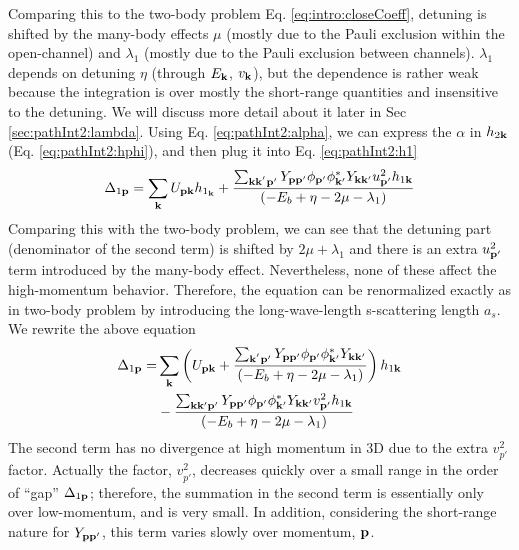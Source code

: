 Comparing this to the two-body problem Eq. \ref{eq:intro:closeCoeff}, detuning is shifted by the many-body effects $\mu$ (mostly due to the Pauli exclusion within the open-channel) and $\lambda_{1}$ (mostly due to the Pauli exclusion between channels). 
$\lambda_{1}$ depends on detuning $\eta$ (through $E_{\mathbf{k}}$, $v_{\mathbf{k}}$), but the dependence is rather weak because the integration is over mostly the short-range quantities and  insensitive to the detuning. We will discuss more detail about it later in Sec \ref{sec:pathInt2:lambda}. 
Using Eq. \ref{eq:pathInt2:alpha}, we can express the $\alpha$ in $h_{2\mathbf{k}}$ (Eq. \ref{eq:pathInt2:hphi}), and then plug it into Eq. \ref{eq:pathInt2:h1}
\begin{equation*}
\Delta_{1\mathbf{p}}=\sum_{\mathbf{k}}{}U_{\mathbf{p}\mathbf{k}}{h_{1_{\mathbf{k}}}}+
	\frac{\sum_{\mathbf{k}\mathbf{k}^{'}\mathbf{p}'} Y_{\mathbf{p}\mathbf{p}'}{\phi_{\mathbf{p}'}}{\phi_{\mathbf{k}'}^{*}}{Y_{\mathbf{k}\mathbf{k}'}}u_{\mathbf{p}'}^{2}{{h_{1\mathbf{k}}}}}
		{\left(-E_{b}+\eta-2\mu-\lambda_{1}\right)}
\end{equation*}
Comparing this with the two-body problem, we can see that the detuning part (denominator of the second term) is shifted by $2\mu+\lambda_{1}$ and there is an extra $u_{\mathbf{p}'}^{2}$ term introduced by the many-body effect.  Nevertheless, none of these affect the high-momentum behavior. Therefore, the equation can be renormalized exactly as in two-body problem by introducing the long-wave-length s-scattering length $a_{s}$.  We rewrite the above equation
\begin{equation*}
\begin{split}
\Delta_{1\mathbf{p}}=&\sum_{\mathbf{k}}\left(U_{\mathbf{p}\mathbf{k}}+
	\frac{\sum_{\mathbf{k}^{'}\mathbf{p}'} Y_{\mathbf{p}\mathbf{p}'}{\phi_{\mathbf{p}'}}{\phi_{\mathbf{k}'}^{*}}{Y_{\mathbf{k}\mathbf{k}'}}}
		{\left(-E_{b}+\eta-2\mu-\lambda_{1}\right)}\right){{h_{1\mathbf{k}}}}\\
	&-\frac{\sum_{\mathbf{k}\mathbf{k}{'}\mathbf{p}'} Y_{\mathbf{p}\mathbf{p}'}{\phi_{\mathbf{p}'}}{\phi_{\mathbf{k}'}^{*}}{Y_{\mathbf{k}\mathbf{k}'}}v_{\mathbf{p}'}^{2}{h_{1\mathbf{k}}}}
		{\left(-E_{b}+\eta-2\mu-\lambda_{1}\right)}{}
\end{split}
\end{equation*}
The second term has no divergence at high momentum in 3D due to the extra $v_{p'}^{2}$ factor. Actually the factor, $v_{p'}^{2}$, decreases quickly over a small range in the order of  ``gap'' $\Delta_{1\mathbf{p}}$; therefore, the summation in the second term is essentially only over low-momentum, and is very small.   In addition, considering the short-range nature for $Y_{\mathbf{p}\mathbf{p}'}$, this term varies slowly over momentum, $\mathbf{p}$.  

